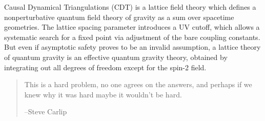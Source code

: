 \documentclass[12pt]{article}
\begin{document}
Causal Dynamical Triangulations (CDT) is a lattice field theory which defines a nonperturbative quantum field theory of gravity as a sum over spacetime geometries. The lattice spacing parameter introduces a UV cutoff, which allows a systematic search for a fixed point via adjustment of the bare coupling constants. But even if asymptotic safety proves to be an invalid assumption, a lattice theory of quantum gravity is an effective quantum gravity theory, obtained by integrating out all degrees of freedom except for the spin-2 field.

\begin{quote}
This is a hard problem, no one agrees on the answers, and perhaps if we knew why it was hard maybe it wouldn't be hard.

--Steve Carlip
\end{quote}
\end{document}
